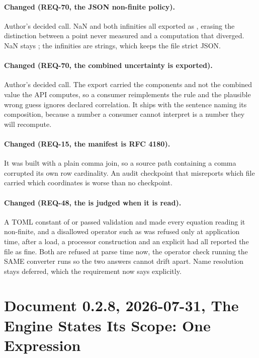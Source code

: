 \paragraph{Changed (REQ-70, the JSON non-finite policy).} Author's
decided call. NaN and both infinities all exported as ,
erasing the distinction between a point never measured and a
computation that diverged. NaN stays ; the infinities are
strings, which keeps the file strict JSON.

\paragraph{Changed (REQ-70, the combined uncertainty is exported).}
Author's decided call. The export carried the components and not the
combined value the API computes, so a consumer reimplements the rule
and the plausible wrong guess ignores declared correlation. It ships
with the sentence naming its composition, because a number a consumer
cannot interpret is a number they will recompute.

\paragraph{Changed (REQ-15, the manifest is RFC 4180).} It was built
with a plain comma join, so a source path containing a comma corrupted
its own row cardinality. An audit checkpoint that misreports which file
carried which coordinates is worse than no checkpoint.

\paragraph{Changed (REQ-48, the  is judged when it is
read).} A TOML constant of  or  passed validation
and made every equation reading it non-finite, and a disallowed
operator such as  was refused only at application time,
after a load, a processor construction and an explicit
 had all reported the file as fine. Both are refused
at parse time now, the operator check running the SAME converter
 runs so the two answers cannot drift apart. Name
resolution stays deferred, which the requirement now says explicitly.

\section*{Document 0.2.8, 2026-07-31, The Engine States Its Scope: One Expression}

